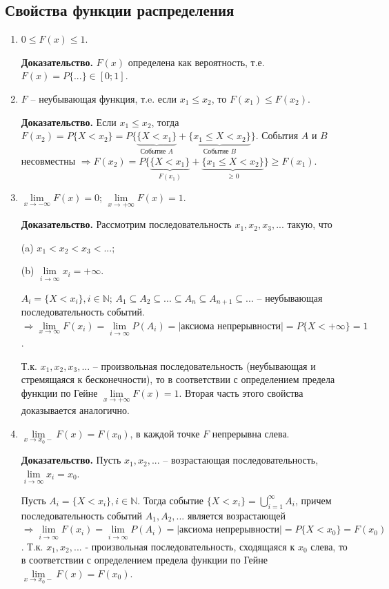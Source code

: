 \subsection*{Свойства функции распределения}
\begin{enumerate}
	\item $0 \leq F(x) \leq 1$.
	
		\textbf{Доказательство.} $F(x)$ определена как вероятность, т.е. $F(x) = P\{...\} \in [0; 1]$.
		
	\item $F$ -- неубывающая функция, т.e. если $x_1 \leq x_2$, то $F(x_1) \leq F(x_2).$
	
		\textbf{Доказательство.} Если $x_1 \leq x_2$, тогда $F(x_2) = P\{X < x_2\} = P\{\underbrace{\{X < x_1\}}_\text{Событие $A$} + \underbrace{\{x_1 \leq X < x_2\}}_\text{Событие $B$}\}$. События $A$ и $B$ несовместны $\Rightarrow F(x_2) = P\{\underbrace{\{X < x_1\}}_\text{$F(x_1)$} + \underbrace{\{x_1 \leq X < x_2\}}_\text{$\geq0$}\} \geq F(x_1)$.  
	
	\item  $\lim\limits_{x \rightarrow -\infty}F(x) = 0$; $\lim\limits_{x \rightarrow +\infty}F(x) = 1$.
	
		\textbf{Доказательство.} Рассмотрим последовательность $x_1, x_2, x_3,...$ такую, что 
		
		(a) $x_1 < x_2 < x_3 < ...$; 
		
		(b) $\lim\limits_{i \rightarrow \infty} x_i = +\infty$.
		
		$A_i = \{X < x_i\}, i \in \mathbb{N}$; $A_1 \subseteq A_2 \subseteq ... \subseteq A_n \subseteq A_{n+1} \subseteq ...$ -- неубывающая последовательность событий. $\Rightarrow \lim\limits_{x \rightarrow \infty} F(x_i) = \lim\limits_{i \rightarrow \infty} P(A_i) = |\text{аксиома непрерывности}| = P\{X < +\infty\} = 1$.
		
		Т.к. $x_1, x_2, x_3,...$ -- произвольная последовательность (неубывающая и стремящаяся к бесконечности), то в соответствии с определением предела функции по Гейне $\lim\limits_{x \rightarrow +\infty}F(x) = 1$. Вторая часть этого свойства доказывается аналогично.
		
	\item $\lim\limits_{x \rightarrow x_0-}F(x) = F(x_0)$, в каждой точке $F$ непрерывна слева.
		
		\textbf{Доказательство.} Пусть $x_1,x_2,...$ -- возрастающая последовательность, $\lim\limits_{i \rightarrow \infty}x_i = x_0$.
		
		Пусть $A_i = \{X < x_i\}, i \in \mathbb{N}$. Тогда событие $\{X < x_i\} = \bigcup_{i=1}^\infty A_i$, причем последовательность событий $A_1,A_2,...$ является возрастающей $\Rightarrow \lim\limits_{i \rightarrow \infty} F(x_i) = \lim\limits_{i \rightarrow \infty} P(A_i) = |\text{аксиома непрерывности}|=P\{X<x_0\} = F(x_0)$. Т.к. $x_1, x_2,...$ - произвольная последовательность, сходящаяся к $x_0$ слева, то в соответствии с определением предела функции по Гейне $\lim\limits_{x \rightarrow x_0-} F(x) = F(x_0)$.
		

\end{enumerate}
